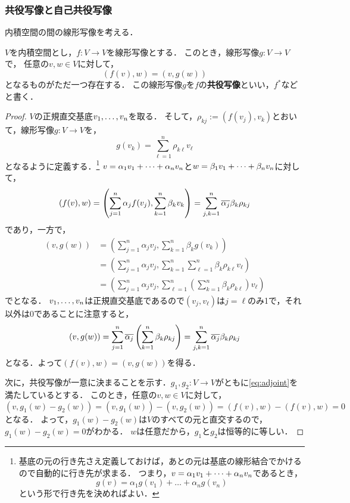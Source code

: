 \subsubsection{共役写像と自己共役写像}
内積空間の間の線形写像を考える．
\begin{dfn}
$V$を内積空間とし，$f \colon V \to V$を線形写像とする．
このとき，線形写像$g \colon V \to V$で，
任意の$v,w\in V$に対して，
\begin{equation}\label{eq:adjoint}
    (f(v),w) = (v,g(w))
\end{equation}
となるものがただ一つ存在する．
この線形写像$g$を$f$の\textbf{共役写像}といい，$f^\ast$などと書く．
\end{dfn}
\begin{proof}
$V$の正規直交基底$\idxdot{v}{1}{n}$を取る．
そして，$\rho_{kj} := (f(v_j),v_k)$とおいて，線形写像$g\colon V \to V$を，
\[
  g(v_k) = \sum_{\ell=1}^n \rho_{k\ell} v_\ell   
\]
となるように定義する．\footnote{基底の元の行き先さえ定義しておけば，あとの元は基底の線形結合でかけるので自動的に行き先が求まる．
つまり，$v = \lncmb{\alpha}{v}{1}{n}{+}$であるとき，
\[
  g(v) = \alpha_1 g(v_1) + \dots + \alpha_n g(v_n)  
\]
という形で行き先を決めればよい．
}
$v = \lncmb{\alpha}{v}{1}{n}{+}$と$w = \lncmb{\beta}{v}{1}{n}{+}$に対して，
\[
  (f(v),w) = \left( \sum_{j=1}^n \alpha_j f(v_j), \sum_{k=1}^n \beta_k v_k \right) = \sum_{j,k=1}^{n} \conj{\alpha_j} \beta_k \rho_{kj}
\]
であり，一方で，
\[
  \begin{aligned}
    (v,g(w)) &= \left( \sum_{j=1}^{n} \alpha_j v_j, \sum_{k=1}^{n} \beta_k g(v_k)  \right)  \\
    &= \left( \sum_{j=1}^{n} \alpha_j v_j, \sum_{k=1}^{n} \sum_{\ell=1}^{n} \beta_k \rho_{k\ell} v_\ell \right) \\
    &= \left( \sum_{j=1}^{n} \alpha_j v_j, \sum_{\ell=1}^{n} \left(\sum_{k=1}^{n} \beta_k \rho_{k\ell} \right) v_\ell \right)
  \end{aligned}
\]
でとなる．
$\idxdot{v}{1}{n}$は正規直交基底であるので$(v_j,v_\ell)$は$j=\ell$のみ1で，それ以外は0であることに注意すると，
\[
  (v,g(w)) = \sum_{j=1}^n \conj{\alpha_j} \left(\sum_{k=1}^{n} \beta_k \rho_{kj} \right)
  =\sum_{j,k=1}^{n} \conj{\alpha_j} \beta_k \rho_{kj}
\]
となる．よって$(f(v),w) = (v,g(w))$を得る．

次に，共役写像が一意に決まることを示す．$g_1,g_2\colon V \to V$がともに\cref{eq:adjoint}を満たしているとする．
このとき，任意の$v,w \in V$に対して，
\[
  (v,g_1(w)-g_2(w)) = (v,g_1(w)) - (v,g_2(w)) = (f(v),w) - (f(v),w) = 0  
\]
となる．
よって，$g_1(w)-g_2(w)$は$V$のすべての元と直交するので，$g_1(w)-g_2(w)=0$がわかる．
$w$は任意だから，$g_1$と$g_2$は恒等的に等しい．
\end{proof}
